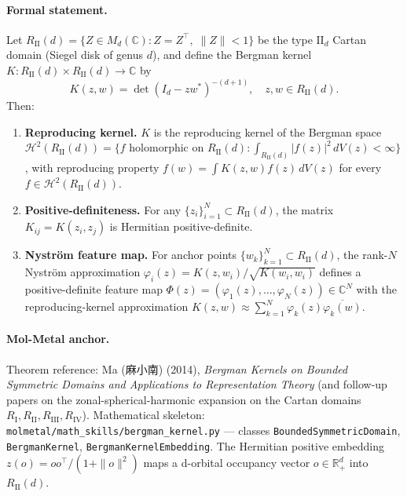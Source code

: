 \paragraph{Formal statement.}
\begin{theorem}[Ma 2014]
\label{thm:T9-bergman}
Let $R_{\mathrm{II}}(d) = \{ Z \in M_d(\mathbb{C}) : Z = Z^{\top},
\; \|Z\| < 1 \}$ be the type $\mathrm{II}_d$ Cartan domain
(Siegel disk of genus $d$), and define the Bergman kernel
$K : R_{\mathrm{II}}(d) \times R_{\mathrm{II}}(d) \to \mathbb{C}$
by
\[
  K(z, w) = \det(I_d - z w^{\ast})^{-(d+1)}, \quad z, w \in
  R_{\mathrm{II}}(d).
\]
Then:
\begin{enumerate}
  \item[(i)] \textbf{Reproducing kernel.}  $K$ is the reproducing
    kernel of the Bergman space
    $\mathcal{H}^2(R_{\mathrm{II}}(d)) = \{ f \text{ holomorphic
    on } R_{\mathrm{II}}(d) : \int_{R_{\mathrm{II}}(d)} |f(z)|^2
    \, dV(z) < \infty \}$, with reproducing property
    $f(w) = \int K(z, w) f(z) \, dV(z)$ for every
    $f \in \mathcal{H}^2(R_{\mathrm{II}}(d))$.
  \item[(ii)] \textbf{Positive-definiteness.}  For any
    $\{z_i\}_{i=1}^N \subset R_{\mathrm{II}}(d)$, the matrix
    $K_{ij} = K(z_i, z_j)$ is Hermitian positive-definite.
  \item[(iii)] \textbf{Nystr\"om feature map.}  For anchor points
    $\{w_k\}_{k=1}^N \subset R_{\mathrm{II}}(d)$, the rank-$N$
    Nystr\"om approximation $\varphi_i(z) = K(z, w_i) / \sqrt{K(w_i,
    w_i)}$ defines a positive-definite feature map
    $\Phi(z) = (\varphi_1(z), \ldots, \varphi_N(z)) \in \mathbb{C}^N$
    with the reproducing-kernel approximation
    $K(z, w) \approx \sum_{k=1}^N \varphi_k(z) \overline{\varphi_k(w)}$.
\end{enumerate}
\end{theorem}

\paragraph{Mol-Metal anchor.}
Theorem reference: Ma (麻小南) (2014), \emph{Bergman Kernels on
Bounded Symmetric Domains and Applications to Representation
Theory} (and follow-up papers on the zonal-spherical-harmonic
expansion on the Cartan domains $R_{\mathrm{I}}, R_{\mathrm{II}},
R_{\mathrm{III}}, R_{\mathrm{IV}}$).  Mathematical skeleton:
\texttt{molmetal/math\_skills/bergman\_kernel.py} --- classes
\texttt{BoundedSymmetricDomain}, \texttt{BergmanKernel},
\texttt{BergmanKernelEmbedding}.  The Hermitian positive embedding
$z(o) = o o^{\top} / (1 + \|o\|^2)$ maps a d-orbital occupancy
vector $o \in \mathbb{R}^d_+$ into $R_{\mathrm{II}}(d)$.


